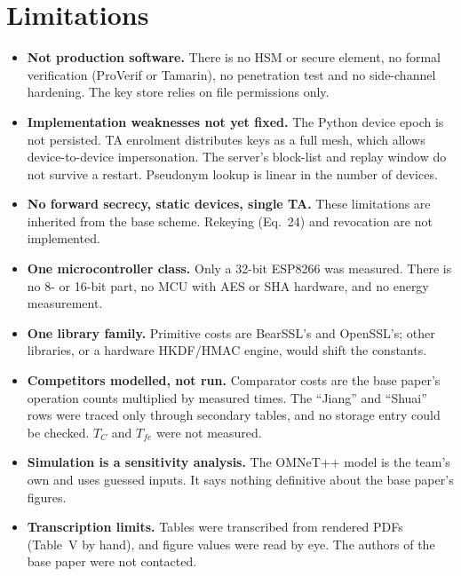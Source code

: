 \documentclass[12pt,a4paper,oneside]{report}
\numberwithin{equation}{chapter}
\begin{document}
\section{Limitations}
\begin{itemize}
  \item \textbf{Not production software.} There is no HSM or secure element, no formal verification (ProVerif or Tamarin), no penetration test and no side-channel hardening. The key store relies on file permissions only.
  \item \textbf{Implementation weaknesses not yet fixed.} The Python device epoch is not persisted. TA enrolment distributes keys as a full mesh, which allows device-to-device impersonation. The server's block-list and replay window do not survive a restart. Pseudonym lookup is linear in the number of devices.
  \item \textbf{No forward secrecy, static devices, single TA.} These limitations are inherited from the base scheme. Rekeying (Eq.~24) and revocation are not implemented.
  \item \textbf{One microcontroller class.} Only a 32-bit ESP8266 was measured. There is no 8- or 16-bit part, no MCU with AES or SHA hardware, and no energy measurement.
  \item \textbf{One library family.} Primitive costs are BearSSL's and OpenSSL's; other libraries, or a hardware HKDF/HMAC engine, would shift the constants.
  \item \textbf{Competitors modelled, not run.} Comparator costs are the base paper's operation counts multiplied by measured times. The ``Jiang'' and ``Shuai'' rows were traced only through secondary tables, and no storage entry could be checked. $T_C$ and $T_{fe}$ were not measured.
  \item \textbf{Simulation is a sensitivity analysis.} The OMNeT++ model is the team's own and uses guessed inputs. It says nothing definitive about the base paper's figures.
  \item \textbf{Transcription limits.} Tables were transcribed from rendered PDFs (Table~V by hand), and figure values were read by eye. The authors of the base paper were not contacted.
\end{itemize}
\end{document}
